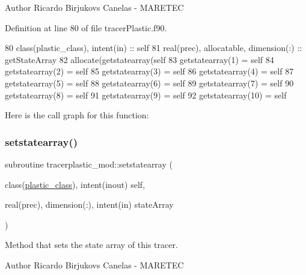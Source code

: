 \begin{DoxyAuthor}{Author}
Ricardo Birjukovs Canelas -\/ M\+A\+R\+E\+T\+EC 
\end{DoxyAuthor}


Definition at line 80 of file tracer\+Plastic.\+f90.


\begin{DoxyCode}
80     \textcolor{keywordtype}{class}(plastic\_class), \textcolor{keywordtype}{intent(in)} :: self
81     \textcolor{keywordtype}{real(prec)}, \textcolor{keywordtype}{allocatable}, \textcolor{keywordtype}{dimension(:)} :: getStateArray
82     \textcolor{keyword}{allocate}(getstatearray(self%
83     getstatearray(1) = self%
84     getstatearray(2) = self%
85     getstatearray(3) = self%
86     getstatearray(4) = self%
87     getstatearray(5) = self%
88     getstatearray(6) = self%
89     getstatearray(7) = self%
90     getstatearray(8) = self%
91     getstatearray(9) = self%
92     getstatearray(10) = self%
\end{DoxyCode}
Here is the call graph for this function\+:
\mbox{\label{namespacetracerplastic__mod_a5e5bd350455400938950d2129c1f4980}} 
\subsubsection{\texorpdfstring{setstatearray()}{setstatearray()}}
{\footnotesize\ttfamily subroutine tracerplastic\+\_\+mod\+::setstatearray (\begin{DoxyParamCaption}\item[{class(\mbox{\hyperlink{structtracerplastic__mod_1_1plastic__class}{plastic\+\_\+class}}), intent(inout)}]{self,  }\item[{real(prec), dimension(\+:), intent(in)}]{state\+Array }\end{DoxyParamCaption})\hspace{0.3cm}{\ttfamily [private]}}



Method that sets the state array of this tracer. 

\begin{DoxyAuthor}{Author}
Ricardo Birjukovs Canelas -\/ M\+A\+R\+E\+T\+EC 
\end{DoxyAuthor}


